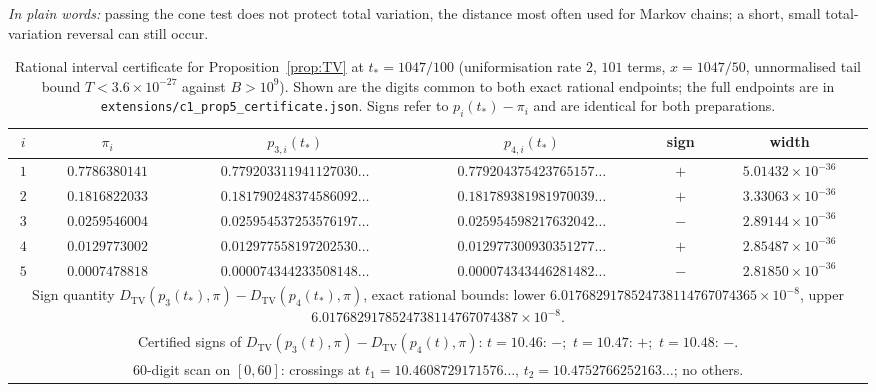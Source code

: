 \documentclass[11pt,a4paper]{article}
\theoremstyle{remark}\newtheorem{remark}[theorem]{Remark}
\newcommand{\TV}{D_{\mathrm{TV}}}
\newcommand{\takeaway}[1]{\par\smallskip\noindent\textit{In plain words:} #1\par\smallskip}
\begin{document}
\takeaway{passing the cone test does not protect total variation, the distance most often used for Markov chains; a short, small total-variation reversal can still occur.}

\begin{table}[tb]
\centering\small
\caption{Rational interval certificate for Proposition~\ref{prop:TV} at $t_*=1047/100$ (uniformisation rate $2$, $101$ terms, $x=1047/50$, unnormalised tail bound $T<3.6\times10^{-27}$ against $B>10^{9}$). Shown are the digits common to both exact rational endpoints; the full endpoints are in \texttt{extensions/c1\_prop5\_certificate.json}. Signs refer to $p_i(t_*)-\pi_i$ and are identical for both preparations.}
\label{tab:prop5cert}
\begin{tabular}{cccccc}
\toprule
$i$ & $\pi_i$ & $p_{3,i}(t_*)$ & $p_{4,i}(t_*)$ & sign & width\\\midrule
$1$ & $0.7786380141$ & $0.779203311941127030\ldots$ & $0.779204375423765157\ldots$ & $+$ & $5.01432\times10^{-36}$\\
$2$ & $0.1816822033$ & $0.181790248374586092\ldots$ & $0.181789381981970039\ldots$ & $+$ & $3.33063\times10^{-36}$\\
$3$ & $0.0259546004$ & $0.025954537253576197\ldots$ & $0.025954598217632042\ldots$ & $-$ & $2.89144\times10^{-36}$\\
$4$ & $0.0129773002$ & $0.012977558197202530\ldots$ & $0.012977300930351277\ldots$ & $+$ & $2.85487\times10^{-36}$\\
$5$ & $0.0007478818$ & $0.000074344233508148\ldots$ & $0.000074343446281482\ldots$ & $-$ & $2.81850\times10^{-36}$\\
\midrule
\multicolumn{6}{p{.95\linewidth}}{\raggedright Sign quantity $\TV(p_3(t_*),\pi)-\TV(p_4(t_*),\pi)$, exact rational bounds: lower $6.0176829178524738114767074365\times10^{-8}$, upper $6.0176829178524738114767074387\times10^{-8}$.}\\
\multicolumn{6}{p{.95\linewidth}}{Certified signs of $\TV(p_3(t),\pi)-\TV(p_4(t),\pi)$: $t=10.46$: $-$;\ $t=10.47$: $+$;\ $t=10.48$: $-$.}\\
\multicolumn{6}{p{.95\linewidth}}{60-digit scan on $[0,60]$: crossings at $t_1=10.4608729171576\ldots$, $t_2=10.4752766252163\ldots$; no others.}\\
\bottomrule
\end{tabular}
\end{table}
\end{document}
